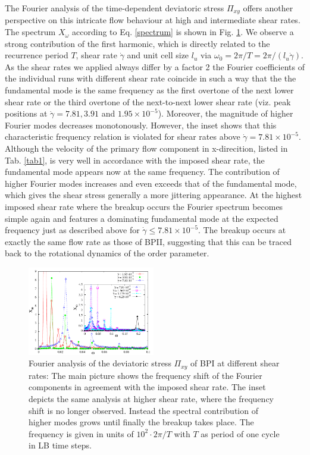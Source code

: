 \documentclass[aps,pre,reprint,superscriptaddress, twocolumn]{revtex4}
\newcommand{\e}[1]{\times10^{#1}}
\newcommand{\gd}{\dot{\gamma}}
\begin{document}
The Fourier analysis of the time-dependent deviatoric stress $\Pi_{xy}$ 
offers another perspective on this intricate flow behaviour at high and intermediate shear rates. 
The spectrum $X_\omega$ according to Eq. \ref{spectrum} is shown in Fig. \ref{bp1-spectrum}.
We observe a strong contribution of the first harmonic, which is directly related to the 
recurrence period $T$, shear rate $\dot{\gamma}$ and unit cell size $l_{u}$ 
via $\omega_0=2\pi/T=2\pi/(l_{u}\dot{\gamma})$.
As the shear rates we applied always differ by a factor 2 the Fourier coefficients of the 
individual runs with different shear rate coincide in such a way that the
the fundamental mode is the same frequency as the first overtone of the next lower shear rate
or the third overtone of the next-to-next lower shear rate 
(viz. peak positions at $\gd=7.81, 3.91$ and $1.95\e{-5}$).
Moreover, the magnitude of higher Fourier modes decreases monotonously.   
However, the inset shows that this characteristic frequency relation is violated 
for shear rates above $\gd=7.81\e{-5}$.
Although the velocity of the primary flow component in x-direcition, listed in Tab. \ref{tab1},
 is very well in accordance with the imposed shear rate, the fundamental mode appears 
now at the same frequency.
The contribution of higher Fourier modes increases and even exceeds that of
the fundamental mode, which gives the shear stress generally a more jittering appearance.
At the highest imposed shear rate where the breakup occurs the Fourier spectrum 
becomes simple again and features a dominating fundamental mode at the 
expected frequency just as described above for $\gd\le7.81\e{-5}$.
The breakup occurs at exactly the same flow rate as those of BPII, 
suggesting that this can be traced back to the rotational dynamics 
of the order parameter.

\begin{figure}[htpb]
\includegraphics[width=0.495\textwidth]{spectrum_bp1.pdf}
\caption{Fourier analysis of the deviatoric stress $\Pi_{xy}$ of BPI at different shear rates: The main picture shows the frequency shift of the Fourier components in agreement with the imposed shear rate. The inset depicts the same analysis at higher shear rate, where the frequency shift is no longer observed. Instead the spectral contribution of higher modes grows until finally the breakup takes place. The frequency is given in units of $10^2\cdot 2\pi/T$ with $T$ as period of one cycle in LB time steps.}
\label{bp1-spectrum}
\end{figure}
\end{document}
